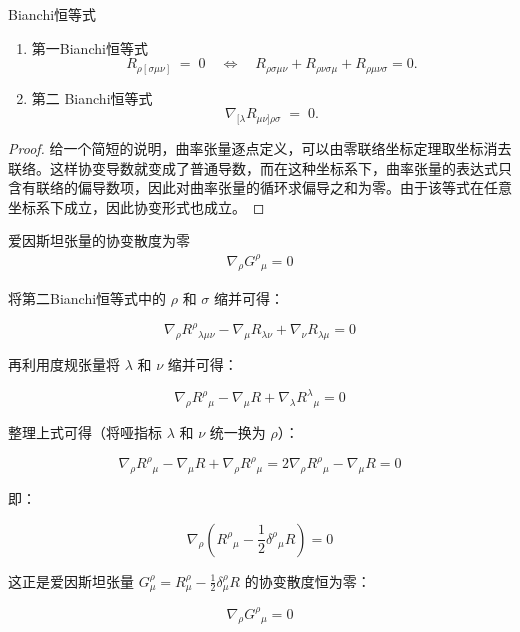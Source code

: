  \begin{theorem}{Bianchi恒等式}
        \begin{enumerate}[label=(\arabic*)]
    \item 第一Bianchi恒等式
      \begin{equation}\label{eq:bianchi1}
  R_{\rho[\sigma\mu\nu]} \;=\; 0
  \quad\Longleftrightarrow\quad
  R_{\rho\sigma\mu\nu} + R_{\rho\nu\sigma\mu} + R_{\rho\mu\nu\sigma} = 0.
  \end{equation}
    \item 第二 Bianchi恒等式
  \begin{equation}\label{eq:bianchi2}
  \nabla_{[\lambda} R_{\mu\nu]\rho\sigma} \;=\; 0.
  \end{equation}
  \end{enumerate}
  \end{theorem}

  \begin{proof}
    给一个简短的说明，曲率张量逐点定义，可以由零联络坐标定理取坐标消去联络。这样协变导数就变成了普通导数，而在这种坐标系下，曲率张量的表达式只含有联络的偏导数项，因此对曲率张量的循环求偏导之和为零。由于该等式在任意坐标系下成立，因此协变形式也成立。
  \end{proof}
  \begin{theorem}{爱因斯坦张量的协变散度为零}
    \begin{align}
      \nabla_{\rho} G^{\rho}{}_{\mu} = 0
    \end{align}
  \end{theorem}
  将第二Bianchi恒等式中的 $\rho$ 和 $\sigma$ 缩并可得：

\[
\nabla_\rho R^\rho{}_{\lambda\mu\nu} - \nabla_\mu R_{\lambda\nu} + \nabla_\nu R_{\lambda\mu} = 0
\]

再利用度规张量将 $\lambda$ 和 $\nu$ 缩并可得：

\[
\nabla_\rho R^\rho{}_\mu - \nabla_\mu R + \nabla_\lambda R^\lambda{}_\mu = 0
\]

整理上式可得（将哑指标 $\lambda$ 和 $\nu$ 统一换为 $\rho$）：

\[
\nabla_\rho R^\rho{}_\mu - \nabla_\mu R + \nabla_\rho R^\rho{}_\mu = 2\nabla_\rho R^\rho{}_\mu - \nabla_\mu R = 0
\]

即：

\[
\nabla_\rho \left(R^\rho{}_\mu - \frac{1}{2}\delta^\rho{}_\mu R\right) = 0
\]

这正是爱因斯坦张量 $G^\rho_\mu = R^\rho_\mu - \frac{1}{2}\delta^\rho_\mu R$ 的协变散度恒为零：

\[
\nabla_\rho G^\rho{}_\mu = 0
\]

